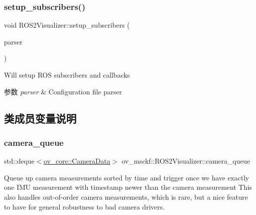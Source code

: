 \subsubsection{\texorpdfstring{setup\+\_\+subscribers()}{setup\_subscribers()}}
{\footnotesize\ttfamily void R\+O\+S2\+Visualizer\+::setup\+\_\+subscribers (\begin{DoxyParamCaption}\item[{std\+::shared\+\_\+ptr$<$ \hyperlink{classov__core_1_1YamlParser}{ov\+\_\+core\+::\+Yaml\+Parser} $>$}]{parser }\end{DoxyParamCaption})}



Will setup R\+OS subscribers and callbacks 


\begin{DoxyParams}{参数}
{\em parser} & Configuration file parser \\
\hline
\end{DoxyParams}


\subsection{类成员变量说明}
\mbox{\label{classov__msckf_1_1ROS2Visualizer_a7235b339b34c7207b2cffb94d4518a25}} 
\subsubsection{\texorpdfstring{camera\+\_\+queue}{camera\_queue}}
{\footnotesize\ttfamily std\+::deque$<$\hyperlink{structov__core_1_1CameraData}{ov\+\_\+core\+::\+Camera\+Data}$>$ ov\+\_\+msckf\+::\+R\+O\+S2\+Visualizer\+::camera\+\_\+queue\hspace{0.3cm}{\ttfamily [protected]}}

Queue up camera measurements sorted by time and trigger once we have exactly one I\+MU measurement with timestamp newer than the camera measurement This also handles out-\/of-\/order camera measurements, which is rare, but a nice feature to have for general robustness to bad camera drivers. 